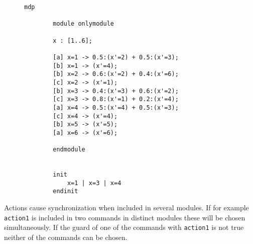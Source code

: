\documentclass[preview]{standalone}
\begin{document}
\begin{figure}
	\begin{lstlisting}[language=prism, caption={\prism model file for the \mdpN \mdp given by Figure \ref{fig:exampleMdp}. This example has only one variable representing the six states in \mdp and the actions \texttt{a}, \texttt{b} and \texttt{c} referring to \action, \actionb, and \actionc in \mdp, which are only used for labeling here.},label={lst:exmpprism}]
		mdp
		
		module onlymodule
		
		x : [1..6];
		
		[a] x=1 -> 0.5:(x'=2) + 0.5:(x'=3);
		[b] x=1 -> (x'=4);
		[b] x=2 -> 0.6:(x'=2) + 0.4:(x'=6);
		[c] x=2 -> (x'=1);
		[b] x=3 -> 0.4:(x'=3) + 0.6:(x'=2);
		[c] x=3 -> 0.8:(x'=1) + 0.2:(x'=4);
		[a] x=4 -> 0.5:(x'=4) + 0.5:(x'=3);
		[c] x=4 -> (x'=4);
		[b] x=5 -> (x'=5);
		[a] x=6 -> (x'=6);
		
		endmodule
		
		
		init
			x=1 | x=3 | x=4
		endinit		
	\end{lstlisting}
\end{figure}

Actions cause synchronization when included in several modules. If for example \texttt{action1} is included in two commands in distinct modules these will be chosen simultaneously. If the guard of one of the commands with \texttt{action1} is not true neither of the commands can be chosen\cite{Kwiatkowska2000, Kwiatkowska2011}.


\end{document}
